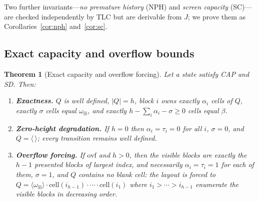\documentclass[11pt]{article}
\newcommand{\seq}[1]{\langle #1\rangle}
\newcommand{\emptyseq}{\seq{\,}}
\newcommand{\len}[1]{\lvert #1\rvert}
\newcommand{\cat}{\mathbin{\cdot}}             %
\newcommand{\BlRow}{\square}                   %
\newcommand{\OvRow}{\boxplus}                  %
\newcommand{\Bcell}{\beta}                     %
\newcommand{\Ocell}{\omega_{\OvRow}}
\newcommand{\ovf}{\mathrm{ovf}}
\newcommand{\Scr}{Q}
\newcommand{\pc}{\mathrm{cell}}
\newtheorem{theorem}{Theorem}[section]
\theoremstyle{definition}
\theoremstyle{remark}
\begin{document}
Two further invariants---\emph{no premature history} (NPH) and \emph{screen
capacity} (SC)---are checked independently by TLC but are derivable from $J$;
we prove them as Corollaries~\ref{cor:nph} and~\ref{cor:sc}.

\subsection{Exact capacity and overflow bounds}

\begin{theorem}[Exact capacity and overflow forcing]\label{thm:capacity}
Let a state satisfy \textup{CAP} and \textup{SD}. Then:
\begin{enumerate}
\item[(i)] \textbf{Exactness.} $\Scr$ is well defined, $\len{\Scr}=h$, block
  $i$ owns exactly $\alpha_i$ cells of $\Scr$, exactly $\sigma$ cells equal
  $\Ocell$, and exactly $h-\sum_i\alpha_i-\sigma\ge 0$ cells equal $\Bcell$.
\item[(ii)] \textbf{Zero-height degradation.} If $h=0$ then $\alpha_i=\tau_i=0$
  for all $i$, $\sigma=0$, and $\Scr=\emptyseq$; every transition remains
  well defined.
\item[(iii)] \textbf{Overflow forcing.} If $\ovf$ and $h>0$, then the visible
  blocks are exactly the $h-1$ presented blocks of largest index, and
  necessarily $\alpha_i=\tau_i=1$ for each of them, $\sigma=1$, and $\Scr$
  contains no blank cell: the layout is \emph{forced} to
  $\Scr=\seq{\Ocell}\cat\pc(i_{h-1})\cat\cdots\cat\pc(i_{1})$ where
  $i_{1}>\cdots>i_{h-1}$ enumerate the visible blocks in decreasing order.
\end{enumerate}
\end{theorem}
\end{document}
